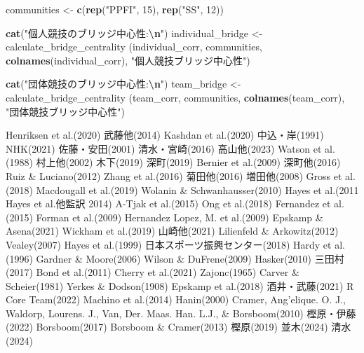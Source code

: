 \documentclass[12pt,a4paper,xelatex,ja=standard]{bxjsarticle}
\newenvironment{Shaded}{\begin{snugshade}}{\end{snugshade}}
\newcommand{\DecValTok}[1]{\textcolor[rgb]{0.00,0.00,0.81}{#1}}
\newcommand{\FunctionTok}[1]{\textcolor[rgb]{0.13,0.29,0.53}{\textbf{#1}}}
\newcommand{\NormalTok}[1]{#1}
\newcommand{\OtherTok}[1]{\textcolor[rgb]{0.56,0.35,0.01}{#1}}
\newcommand{\SpecialCharTok}[1]{\textcolor[rgb]{0.81,0.36,0.00}{\textbf{#1}}}
\newcommand{\StringTok}[1]{\textcolor[rgb]{0.31,0.60,0.02}{#1}}
\begin{document}
\begin{Shaded}
\begin{Highlighting}[]
\NormalTok{communities }\OtherTok{\textless{}{-}} \FunctionTok{c}\NormalTok{(}\FunctionTok{rep}\NormalTok{(}\StringTok{"PPFI"}\NormalTok{, }\DecValTok{15}\NormalTok{), }\FunctionTok{rep}\NormalTok{(}\StringTok{"SS"}\NormalTok{, }\DecValTok{12}\NormalTok{)) }

\FunctionTok{cat}\NormalTok{(}\StringTok{"個人競技のブリッジ中心性:}\SpecialCharTok{\textbackslash{}n}\StringTok{"}\NormalTok{)}
\NormalTok{individual\_bridge }\OtherTok{\textless{}{-}}\NormalTok{ calculate\_bridge\_centrality}
\NormalTok{(individual\_corr, communities, }
  \FunctionTok{colnames}\NormalTok{(individual\_corr), }\StringTok{"個人競技ブリッジ中心性"}\NormalTok{)}

\FunctionTok{cat}\NormalTok{(}\StringTok{"団体競技のブリッジ中心性:}\SpecialCharTok{\textbackslash{}n}\StringTok{"}\NormalTok{)}
\NormalTok{team\_bridge }\OtherTok{\textless{}{-}}\NormalTok{ calculate\_bridge\_centrality}
\NormalTok{(team\_corr, communities, }
\FunctionTok{colnames}\NormalTok{(team\_corr), }\StringTok{"団体競技ブリッジ中心性"}\NormalTok{)}
\end{Highlighting}
\end{Shaded}

\clearpage

Henriksen et al.(2020) 武藤他(2014) Kashdan et al.(2020) 中込・岸(1991)
NHK(2021) 佐藤・安田(2001) 清水・宮崎(2016) 高山他(2023) Watson et
al.(1988) 村上他(2002) 木下(2019) 深町(2019) Bernier et al.(2009)
深町他(2016) Ruiz \& Luciano(2012) Zhang et al.(2016) 菊田他(2016)
増田他(2008) Gross et al.(2018) Macdougall et al.(2019) Wolanin \&
Schwanhausser(2010) Hayes et al.(2011 Hayes et al.他監訳 2014) A-Tjak et
al.(2015) Ong et al.(2018) Fernandez et al.(2015) Forman et al.(2009)
Hernandez Lopez, M. et al.(2009) Epskamp \& Asena(2021) Wickham et
al.(2019) 山崎他(2021) Lilienfeld \& Arkowitz(2012) Vealey(2007) Hayes
et al.(1999) 日本スポーツ振興センター(2018) Hardy et al.(1996) Gardner
\& Moore(2006) Wilson \& DuFrene(2009) Hasker(2010) 三田村(2017) Bond et
al.(2011) Cherry et al.(2021) Zajonc(1965) Carver \& Scheier(1981)
Yerkes \& Dodson(1908) Epskamp et al.(2018) 酒井・武藤(2021) R Core
Team(2022) Machino et al.(2014) Hanin(2000) Cramer, Ang'elique. O. J.,
Waldorp, Lourens. J., Van, Der. Maas. Han. L.J., \& Borsboom(2010)
樫原・伊藤(2022) Borsboom(2017) Borsboom \& Cramer(2013) 樫原(2019)
並木(2024) 清水(2024)
\end{document}
